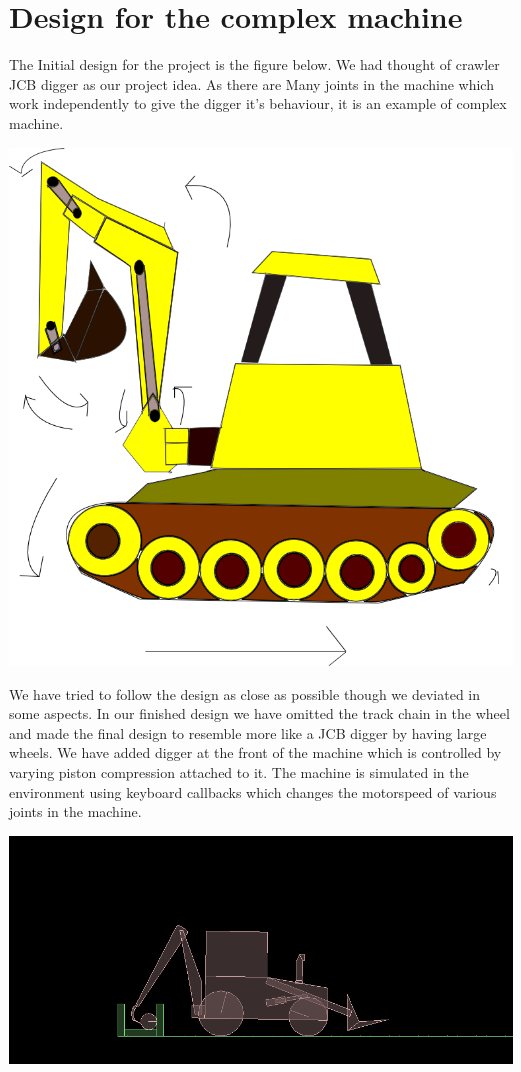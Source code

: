 \documentclass[11pt]{article}
\begin{document}
\section{Design for the complex machine}
The Initial design for the project is the figure below. We had thought of crawler JCB digger as our project idea. As there are Many joints in the machine
which work independently to give the digger it's behaviour, it is an example of complex machine.
\begin{center}
	\includegraphics[scale=0.5]{images/drawing}
\end{center}	
We have tried to follow the design as close as possible though we deviated in some aspects. In our finished design we have omitted the track chain in the 
wheel and made the final design to resemble more like a JCB digger by having large wheels. We have added digger at the front of the machine which is controlled 
by varying piston compression attached to it. The machine is simulated in the environment using keyboard callbacks which changes the motorspeed of various 
joints in the machine.
\begin{center}
	\includegraphics[scale=0.5]{images/final_design}
\end{center}
\end{document}
